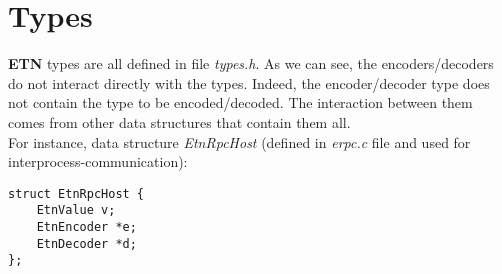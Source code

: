 

\section*{Types}
\textbf{ETN} types are all defined in file \emph{types.h}.
As we can see, the encoders/decoders do not interact directly with the types. Indeed, the encoder/decoder type does not contain the type to be encoded/decoded. The interaction between them comes from other data structures that contain them all.\\
For instance, data structure \emph{EtnRpcHost} (defined in \emph{erpc.c} file and used for interprocess-communication):
\begin{lstlisting}
struct EtnRpcHost {
	EtnValue v;
	EtnEncoder *e;
	EtnDecoder *d;
};
\end{lstlisting}


